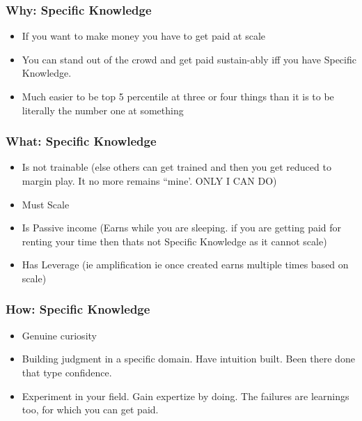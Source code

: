 \begin{frame}[fragile]
\frametitle{Why: Specific Knowledge}
\begin{itemize}
\item If you want to make money you have to get paid at scale
\item You can stand out of the crowd and get paid sustain-ably iff you have Specific Knowledge.
\item  Much easier to be top 5 percentile at three or four things than it is to be literally the number one at something
\end{itemize}
\end{frame}

\begin{frame}[fragile]
\frametitle{What: Specific Knowledge}
\begin{itemize}
\item Is not trainable (else others can get trained and then you get reduced to margin play. It no more remains ``mine'. ONLY I CAN DO)
\item Must Scale
\item Is Passive income (Earns while you are sleeping. if you are getting paid for renting your time then thats not Specific Knowledge as it cannot scale)
\item Has Leverage (ie amplification ie once created earns multiple times based on scale)
\end{itemize}
\end{frame}

\begin{frame}[fragile]
\frametitle{How: Specific Knowledge}
\begin{itemize}
\item Genuine curiosity
\item Building judgment in a specific domain. Have intuition built. Been there done that type confidence.
\item Experiment in your field. Gain expertize by doing. The failures are learnings too, for which you can get paid.
\end{itemize}
\end{frame}
